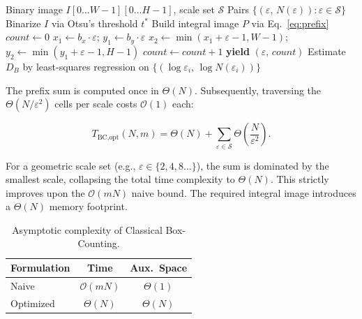\begin{algorithm}[t]
\caption{Optimized Box-Counting (Integral Image)}
\label{alg:bc_opt}
\begin{algorithmic}[1]
\Require Binary image $I[0\ldots W{-}1][0\ldots H{-}1]$, scale set $\mathcal{S}$
\Ensure Pairs $\{(\varepsilon,\, N(\varepsilon)) : \varepsilon \in \mathcal{S}\}$
\State Binarize $I$ via Otsu's threshold $t^{*}$ \cite{Otsu1979}
\State Build integral image $P$ via Eq.~\eqref{eq:prefix} \hfill {}
  \State $\mathit{count} \leftarrow 0$
      \State $x_1 \leftarrow b_x \cdot \varepsilon$;\; $y_1 \leftarrow b_y \cdot \varepsilon$
      \State $x_2 \leftarrow \min(x_1{+}\varepsilon{-}1, W{-}1)$;\; $y_2 \leftarrow \min(y_1{+}\varepsilon{-}1, H{-}1)$
       \hfill{}
        \State $\mathit{count} \leftarrow \mathit{count} + 1$
      \EndIf
    \EndFor
  \EndFor
  \State \textbf{yield} $(\varepsilon,\, \mathit{count})$
\EndFor
\State Estimate $D_B$ by least-squares regression on $\{(\log \varepsilon_i,\, \log N(\varepsilon_i))\}$
\end{algorithmic}
\end{algorithm}

The prefix sum is computed once in $\Theta(N)$. Subsequently, traversing the $\Theta(N/\varepsilon^{2})$ cells per scale costs $\mathcal{O}(1)$ each:

\begin{equation}
  T_{\text{BC,opt}}(N, m)
    = \Theta(N)
    + \sum_{\varepsilon \in \mathcal{S}}
      \Theta\!\left(\frac{N}{\varepsilon^{2}}\right).
  \label{eq:bc_opt_time}
\end{equation}

For a geometric scale set (e.g., $\varepsilon \in \{2, 4, 8 \ldots\}$), the sum is dominated by the smallest scale, collapsing the total time complexity to $\Theta(N)$. This strictly improves upon the $\mathcal{O}(mN)$ naive bound. The required integral image introduces a $\Theta(N)$ memory footprint.

\begin{table}[h]
\centering
\caption{Asymptotic complexity of Classical Box-Counting.}
\label{tab:bc_complexity}
\begin{tabular}{lcc}
\hline
\textbf{Formulation} & \textbf{Time} & \textbf{Aux.\ Space} \\
\hline
Naive     & $\mathcal{O}(mN)$ & $\Theta(1)$ \\
Optimized & $\Theta(N)$       & $\Theta(N)$ \\
\hline
\end{tabular}
\end{table}

